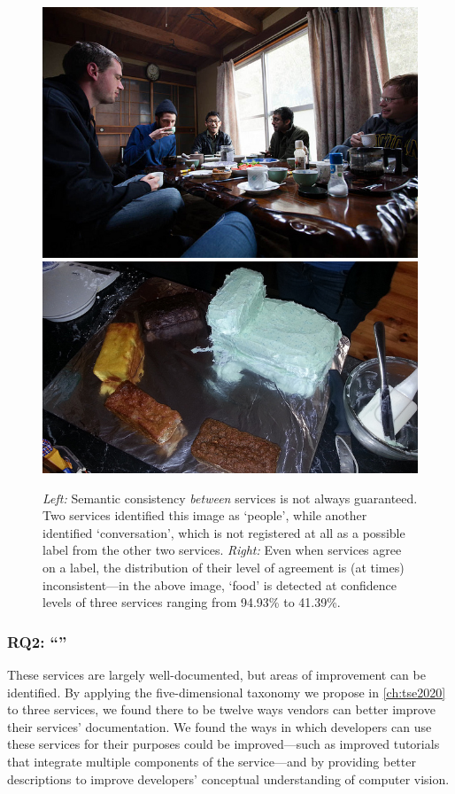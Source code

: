\begin{figure}[h]
    \centering
    \includegraphics[width=0.45\linewidth]{mainmatter/publications/figures/icsme2019/000000009590.jpg}
    \hfill
    \includegraphics[width=0.45\linewidth]{mainmatter/publications/figures/icsme2019/000000095707.jpg}
    \caption{\textit{Left:} Semantic consistency \textit{between} services is not always guaranteed. Two services identified this image as `people', while another identified `conversation', which is not registered at all as a possible label from the other two services. \textit{Right:} Even when services agree on a label, the distribution of their level of agreement is (at times) inconsistent---in the above image, `food' is detected at confidence levels of three services ranging from 94.93\% to 41.39\%.}
    \label{fig:conclusion:consistency}
\end{figure}

\subsubsection[Answering RQ2]{RQ2: ``\RQTwoTextDocumentation{}''}
\begin{callout}
These services are largely well-documented, but areas of improvement can be identified. By applying the five-dimensional taxonomy we propose in \cref{ch:tse2020} to three services, we found there to be  twelve ways vendors can better improve their services' documentation. We found the ways in which developers can use these services for their purposes could be improved---such as improved tutorials that integrate \textup{multiple} components of the service---and by providing better descriptions to improve developers' conceptual understanding of computer vision.
\end{callout}

